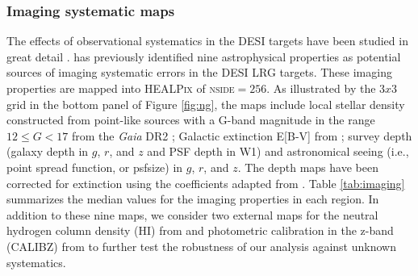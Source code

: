 \subsubsection{Imaging systematic maps}
The effects of observational systematics in the DESI targets have been studied in great detail \cite[see, e.g.,][]{kitanidis2020imaging, zhou2021clustering, chaussidon2022angular}.  \cite{zhou2022target} has previously identified nine astrophysical properties as potential sources of imaging systematic errors in the DESI LRG targets. These imaging properties are mapped into \textsc{HEALPix} of \textsc{nside}$=256$. As illustrated by the $3x3$ grid in the bottom panel of Figure \ref{fig:ng}, the maps include local stellar density constructed from point-like sources with a G-band magnitude in the range $12 \leq G < 17$ from the \textit{Gaia} DR2 \citep[see,][]{gaiadr2, myers2022}; Galactic extinction E[B-V] from \cite{schlegel1998maps}; survey depth (galaxy depth in $g$, $r$, and $z$ and PSF depth in W1) and astronomical seeing (i.e., point spread function, or psfsize) in $g$, $r$, and $z$. The depth maps have been corrected for extinction using the coefficients adapted from \cite{2011ApJ...737..103S}. Table \ref{tab:imaging} summarizes the median values for the imaging properties in each region. In addition to these nine maps, we consider two external maps for the neutral hydrogen column density (HI) from \cite{2016A&A...594A.116H} and photometric calibration in the z-band (CALIBZ) from \cite{desi2023sv} to further test the robustness of our analysis against unknown systematics.

